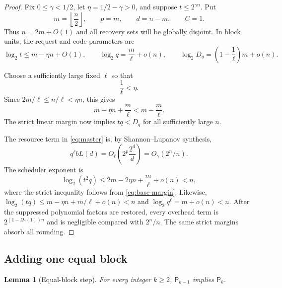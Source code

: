 \documentclass[11pt]{article}
\newtheorem{lemma}[lemma]{Lemma}
\begin{document}
\begin{proof}
Fix $0\le\gamma<1/2$, let $\eta=1/2-\gamma>0$, and suppose
$t\le2^{\gamma n}$.  Put
\[
  m=\left\lfloor\frac n2\right\rfloor,
  \qquad p=m,
  \qquad d=n-m,
  \qquad C=1.
\]
Thus $n=2m+O(1)$ and all recovery sets will be globally disjoint.  In block
units, the request and code parameters are
\[
  \log_2t\le m-\eta n+O(1),
  \qquad
  \log_2q=\frac m\ell+o(n),
  \qquad
  \log_2D_q=\left(1-\frac1\ell\right)m+o(n).
\]

Choose a sufficiently large fixed $\ell$ so that
\begin{equation}\label{eq:base-margin}
  \frac1\ell<\eta.
\end{equation}
Since $2m/\ell\le n/\ell<\eta n$, this gives
\[
  m-\eta n+\frac m\ell
  <m-\frac m\ell.
\]
The strict linear margin now implies $tq<D_q$ for all sufficiently large $n$.

The resource term in \cref{eq:master} is, by Shannon--Lupanov synthesis,
\[
  q^\ell bL(d)
  =O_\ell\!\left(2^p\frac{2^d}{d}\right)
  =O_\gamma(2^n/n).
\]
The scheduler exponent is
\[
  \log_2(t^2q)
  \le 2m-2\eta n+\frac m\ell+o(n)<n,
\]
where the strict inequality follows from \eqref{eq:base-margin}.  Likewise,
$\log_2(tq)\le m-\eta n+m/\ell+o(n)<n$ and
$\log_2q^\ell=m+o(n)<n$.  After the suppressed polynomial factors are
restored, every overhead term is $2^{(1-\Omega_\gamma(1))n}$ and is negligible
compared with $2^n/n$.  The same strict margins absorb all rounding.
\end{proof}

\subsection{Adding one equal block}

\begin{lemma}[Equal-block step]\label{lem:block-step}
For every integer $k\ge2$, $\mathsf P_{k-1}$ implies $\mathsf P_k$.
\end{lemma}
\end{document}
